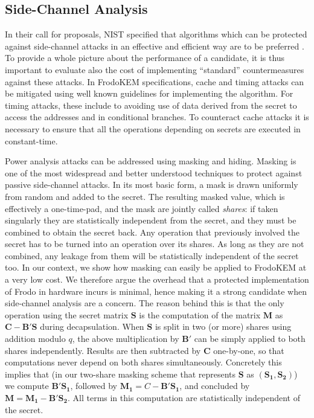 \vspace{-0.2cm}

\subsection{Side-Channel Analysis} \label{sec:mask}

In their call for proposals, NIST specified that algorithms which can be protected against side-channel attacks in an effective and efficient way are to be preferred \cite{nistsca}. To provide a whole picture about the performance of a candidate, it is thus important to evaluate also the cost of implementing ``standard'' countermeasures against these attacks. In FrodoKEM specifications, cache and timing attacks can be mitigated using well known guidelines for implementing the algorithm. For timing attacks, these include to avoiding use of data derived from the secret to access the addresses and in conditional branches. To counteract cache attacks it is necessary to ensure that all the operations depending on secrets are executed in constant-time.

Power analysis attacks can be addressed using masking and hiding. Masking is one of the most widespread and better understood techniques to protect
against passive side-channel attacks. In its most basic form, a mask is drawn uniformly from random and added to the secret. The resulting masked value, which is effectively a one-time-pad, and the mask are jointly called \emph{shares}: if taken
singularly they are statistically independent from the secret, and they must be combined to obtain the secret back. Any operation that previously involved the secret has to be turned into an operation over its shares. As long as they are not combined, any leakage from them will be statistically independent of the secret too. In our context, we show how masking can easily be applied to FrodoKEM at a very low cost. We therefore argue the overhead that a protected implementation of Frodo in hardware incurs is minimal, hence making it a strong candidate when side-channel analysis are a concern. The reason behind this is that the only operation using the secret matrix $\mathbf{S}$ is the computation of the matrix $\mathbf{M}$ as $\mathbf{C} - \mathbf{B}'\mathbf{S}$ during decapsulation. When $\mathbf{S}$ is split in two (or more) shares using addition modulo $q$, the above multiplication by $\mathbf{B}'$ can be simply applied to both shares independently. Results are then subtracted by $\mathbf{C}$ one-by-one, so that computations never depend on both shares simultaneously. Concretely this implies that (in our two-share masking scheme that represents $\mathbf{S}$ as $(\mathbf{S_1},\mathbf{S_2})$) we compute $\mathbf{B}'\mathbf{S_1}$, followed by $\mathbf{M_1}=C-\mathbf{B}'\mathbf{S_1}$, and concluded by $\mathbf{M}=\mathbf{M_1}-\mathbf{B}'\mathbf{S_2}$. All terms in this computation are statistically independent of the secret. 

